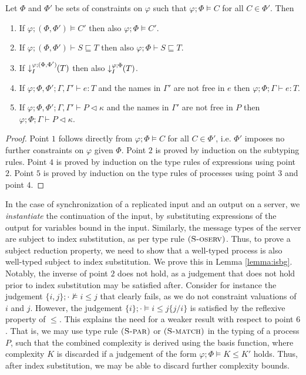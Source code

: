 \begin{lemma}[Strengthening]\label{lemma:strengthening} Let $\Phi$ and $\Phi'$ be sets of constraints on $\varphi$ such that $\varphi;\Phi\vDash C$ for all $C\in\Phi'$. Then
\begin{enumerate}
    \item If $\varphi;(\Phi,\Phi')\vDash C'$ then also $\varphi;\Phi\vDash C'$.
    \item If $\varphi;(\Phi,\Phi')\vdash S \sqsubseteq T$ then also $\varphi;\Phi\vdash S \sqsubseteq T$.
    \item If $\susume{T}{\varphi}{(\Phi,\Phi')}{I}$ then also $\susume{T}{\varphi}{\Phi}{I}$.
    \item If $\varphi;\Phi,\Phi';\Gamma,\Gamma'\vdash e : T$ and the names in $\Gamma'$ are not free in $e$ then $\varphi;\Phi;\Gamma\vdash e : T$.
    \item If $\varphi;\Phi,\Phi';\Gamma,\Gamma'\vdash P \triangleleft \kappa$ and the names in $\Gamma'$ are not free in $P$ then $\varphi;\Phi;\Gamma\vdash P \triangleleft \kappa$.
\end{enumerate}
\begin{proof} Point $1$ follows directly from $\varphi;\Phi\vDash C$ for all $C\in\Phi'$, i.e. $\Phi'$ imposes no further constraints on $\varphi$ given $\Phi$. Point $2$ is proved by induction on the subtyping rules. Point $4$ is proved by induction on the type rules of expressions using point $2$. Point $5$ is proved by induction on the type rules of processes using point $3$ and point $4$.
 \end{proof}
 \end{lemma}
%
In the case of synchronization of a replicated input and an output on a server, we \textit{instantiate} the continuation of the input, by substituting expressions of the output for variables bound in the input. Similarly, the message types of the server are subject to index substitution, as per type rule $\runa{S-oserv}$. Thus, to prove a subject reduction property, we need to show that a well-typed process is also well-typed subject to index substitution. We prove this in Lemma \ref{lemma:isbg}. Notably, the inverse of point $2$ does not hold, as a judgement that does not hold prior to index substitution may be satisfied after. Consider for instance the judgement $\{i,j\};\cdot\nvDash i \leq j$ that clearly fails, as we do not constraint valuations of $i$ and $j$. However, the judgement $\{i\};\cdot\vDash i \leq j\{j/i\}$ is satisfied by the reflexive property of $\leq$. This explains the need for a weaker result with respect to point $6$. That is, we may use type rule $\runa{S-par}$ or $\runa{S-match}$ in the typing of a process $P$, such that the combined complexity is derived using the basis function, where complexity $K$ is discarded if a judgement of the form $\varphi;\Phi\vDash K \leq K'$ holds. Thus, after index substitution, we may be able to discard further complexity bounds.
